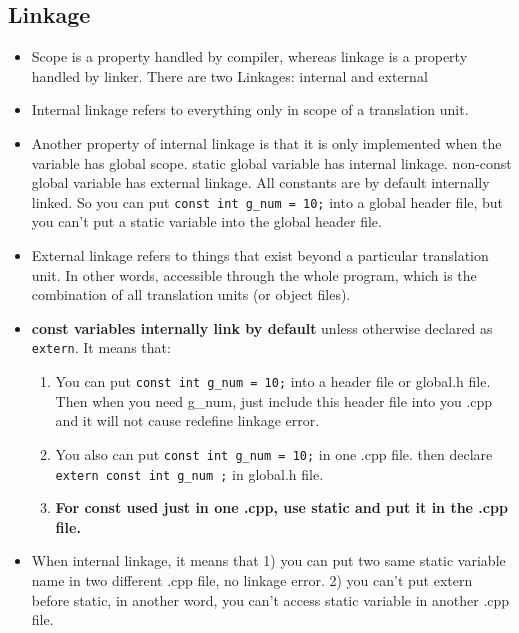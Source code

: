 \documentclass[a4paper,12pt,twoside]{book}
\begin{document}
\subsection{Linkage}
\begin{itemize}
	\item Scope is a property handled by compiler, whereas linkage is a property handled by linker. There are two Linkages: internal and external
	
	\item Internal linkage refers to everything only in scope of a translation unit.
	
	\item Another property of internal linkage is that it is only implemented when the variable has global scope. static global variable has internal linkage. non-const global variable has external linkage. All constants are by default internally linked. So you can put \texttt{const int g\_num = 10;} into a global header file, but you can't put a static variable into the global header file.
	
	\item External linkage refers to things that exist beyond a particular translation unit. In other words, accessible through the whole program, which is the combination of all translation units (or object files).
	


	\item \textbf{const variables internally link by default} unless otherwise declared as \texttt{extern}. It means that:
	
	\begin{enumerate}
		\item You can put \texttt{const int g\_num = 10;} into a header file or global.h file. Then when you need g\_num, just include this header file into you .cpp and it will not cause redefine linkage error.
		
		\item You also can put \texttt{const int g\_num = 10;} in one .cpp file. then declare \texttt{extern const int g\_num ;} in global.h file.
		
		\item \textbf{For const used just in one .cpp, use static and put it in the .cpp file.}
	\end{enumerate}
	
	\item When internal linkage, it means that 1) you can put two same static variable name in two different .cpp file, no linkage error. 2) you can't put extern before static, in another word, you can't access static variable in another .cpp file. 
	

\end{itemize}
\end{document}
